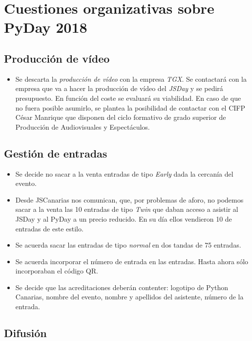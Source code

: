 \documentclass[a4paper, 12pt]{article}
\begin{document}
    \section{Cuestiones organizativas sobre PyDay 2018}

    \subsection*{Producción de vídeo}

    \begin{itemize}
        \item Se descarta la \textit{producción de vídeo} con la empresa \textit{TGX}. Se contactará con la empresa que va a hacer la producción de vídeo del \textit{JSDay} y se pedirá presupuesto. En función del coste se evaluará su viabilidad. En caso de que no fuera posible asumirlo, se plantea la posibilidad de contactar con el CIFP César Manrique que disponen del ciclo formativo de grado superior de Producción de Audiovisuales y Espectáculos.
    \end{itemize}

    \subsection*{Gestión de entradas}

    \begin{itemize}
        \item Se decide no sacar a la venta entradas de tipo \textit{Early} dada la cercanía del evento.
        \item Desde JSCanarias nos comunican, que, por problemas de aforo, no podemos sacar a la venta las 10 entradas de tipo \textit{Twin} que daban acceso a asistir al JSDay y al PyDay a un precio reducido. En su día ellos vendieron 10 de entradas de este estilo.
        \item Se acuerda sacar las entradas de tipo \textit{normal} en dos tandas de 75 entradas.
        \item Se acuerda incorporar el número de entrada en las entradas. Hasta ahora sólo incorporaban el código QR.
        \item Se decide que las acreditaciones deberán contenter: logotipo de Python Canarias, nombre del evento, nombre y apellidos del asistente, número de la entrada.
    \end{itemize}

    \subsection*{Difusión}
\end{document}
